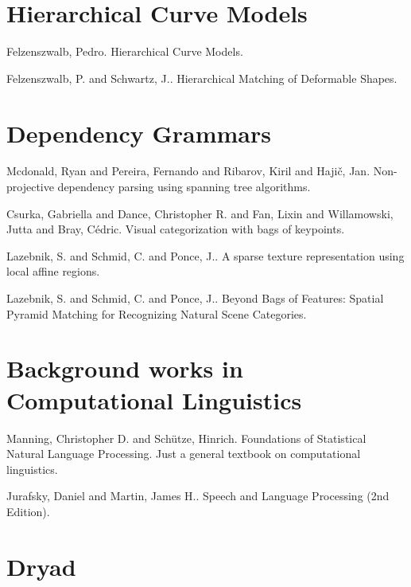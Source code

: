 \documentclass{article}
\begin{document}
\section{ Hierarchical Curve Models} 

\bitem
\item Felzenszwalb, Pedro. Hierarchical Curve Models. \cite{FelzenszwalbHierarchical} \item Felzenszwalb, P. and Schwartz, J.. Hierarchical Matching of Deformable Shapes. \cite{Felzenszwalb07} 
\eitem

\section{ Dependency Grammars} 

\bitem
\item Mcdonald, Ryan and Pereira, Fernando and Ribarov, Kiril and Haji\v{c}, Jan. Non-projective dependency parsing using spanning tree algorithms. \cite{Mcdonald2005Nonprojective} \item Csurka, Gabriella and Dance, Christopher R. and Fan, Lixin and Willamowski, Jutta and Bray, C\'{e}dric. Visual categorization with bags of keypoints. \cite{Csurka2004Visual} \item Lazebnik, S. and Schmid, C. and Ponce, J.. A sparse texture representation using local affine regions. \cite{Lazebnik2005Sparse} \item Lazebnik, S. and Schmid, C. and Ponce, J.. Beyond Bags of Features: Spatial Pyramid Matching for Recognizing Natural Scene Categories. \cite{Lazebnik2006Beyond} 
\eitem

\section{ Background works in Computational Linguistics} 

\bitem
\item Manning, Christopher D. and Sch\"{u}tze, Hinrich. Foundations of Statistical Natural Language Processing. \cite{manning-schutze} 
Just a general textbook on computational linguistics.

\item Jurafsky, Daniel and Martin, James H.. Speech and Language Processing (2nd Edition). \cite{Jurafsky2008Speech} 
\eitem

\section{ Dryad} 
\end{document}
